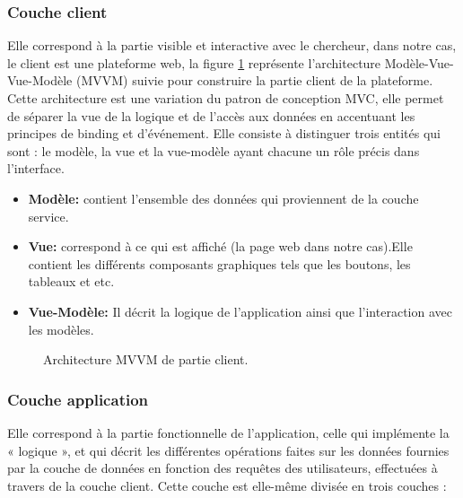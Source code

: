 \subsubsection{Couche client}
Elle correspond à la partie visible et interactive avec le chercheur, dans notre cas, le client est une plateforme web, la figure \ref{clientside} représente l'architecture Modèle-Vue-Vue-Modèle (MVVM) suivie pour construire la partie client de la plateforme. Cette architecture est une variation du patron de conception MVC, elle permet de séparer la vue de la logique et de l'accès aux données en accentuant les principes de binding et d’événement. Elle consiste à distinguer trois entités qui sont : le modèle, la vue et la vue-modèle ayant chacune un rôle précis dans l’interface.
\begin{itemize}
	\item	\textbf{Modèle:} contient l’ensemble des données qui proviennent de la couche service. 
	\item	\textbf{Vue:} correspond à ce qui est affiché (la page web dans notre cas).Elle contient les différents composants graphiques tels que les boutons, les tableaux et etc. 
	\item	\textbf{Vue-Modèle:} Il décrit la logique de l’application ainsi que l’interaction avec les modèles.
\end{itemize}


\begin{figure}[H]
	\centering
	\caption{Architecture MVVM de partie client.}
	\label{clientside}
\end{figure}

\subsubsection{Couche application}
Elle correspond à la partie fonctionnelle de l'application, celle qui implémente la « logique », et qui décrit les différentes opérations faites sur les données fournies par la couche de données en fonction des requêtes des utilisateurs, effectuées à travers de la couche client. Cette couche est elle-même divisée en trois couches : 

